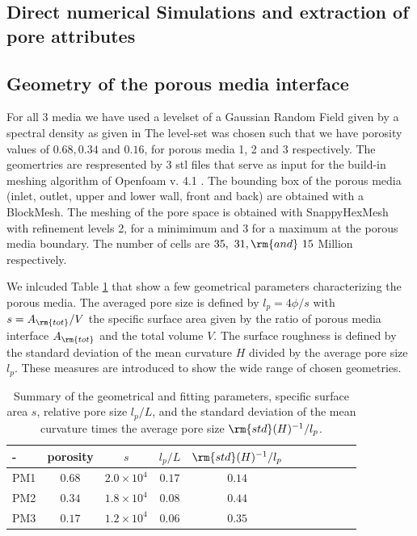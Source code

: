 \documentclass[draft,jgrga]{agutexSI2019}
\begin{document}
\begin{article}
\section{Direct numerical Simulations and extraction of pore attributes}

\subsection{Geometry of the porous media interface}
For all 3 media we have used a levelset of a Gaussian Random Field given by a spectral density as given in \cite{roberts_transport_1995} The level-set was chosen such that we have porosity values of $0.68,0.34$ and $0.16$, for porous media 1, 2 and 3 respectively. The geomertries are respresented by 3 stl files that serve as input for the build-in meshing algorithm of Openfoam v. 4.1 . The bounding box of the porous media (inlet, outlet, upper and lower wall, front and back) are obtained with a BlockMesh. The meshing of the pore space is obtained with SnappyHexMesh with refinement levels 2, for a minimimum and 3 for a maximum at the porous media boundary. The number of cells are $35,~ 31,\rm{and}~15$ Million respectively.

We inlcuded Table \ref{tab:results_geometries} that show a few geometrical parameters characterizing the porous media. The averaged pore size is defined by $l_p = 4 \phi/s$ with $s= A_{\rm{tot}}/V$ the specific surface area given by the ratio of porous media interface $A_{\rm{tot}}$ and the total volume $V$. The surface roughness is defined by the standard deviation of the mean curvature $H$ divided by the average pore size $l_p$. These measures are introduced to show the wide range of chosen geometries. 

\begin{table}[htbp!]
\caption{Summary of the geometrical and fitting parameters, specific surface area $s$, relative pore size $l_p/L$, and the standard deviation of the mean curvature times the average pore size $\rm{std}(H)^{-1}/l_p$.}

\begin{tabular}{l|c|c|c|c|c|c|c|c|c|c}
- & porosity & $s$ & $ l_p/L$ &  $\rm{std}(H)^{-1}/l_p$ \\
\hline
PM1 &$0.68$ & $2.0\times10^{4}$ & $0.17$ &  $0.14$ \\
PM2 & $0.34$ & $1.8\times10^{4}$ & $0.08$ &  $0.44$ \\
PM3 & $0.17$ & $1.2\times10^{4}$ & $0.06$ &  $0.35$ 
\end{tabular}
\label{tab:results_geometries}
\end{table}



\end{article}
\end{document}
